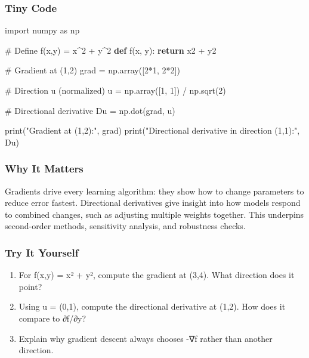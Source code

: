 \documentclass[
  letterpaper,
  DIV=11,
  numbers=noendperiod]{scrreprt}
\newenvironment{Shaded}{\begin{snugshade}}{\end{snugshade}}
\newcommand{\BuiltInTok}[1]{\textcolor[rgb]{0.00,0.23,0.31}{#1}}
\newcommand{\CommentTok}[1]{\textcolor[rgb]{0.37,0.37,0.37}{#1}}
\newcommand{\ControlFlowTok}[1]{\textcolor[rgb]{0.00,0.23,0.31}{\textbf{#1}}}
\newcommand{\DecValTok}[1]{\textcolor[rgb]{0.68,0.00,0.00}{#1}}
\newcommand{\ImportTok}[1]{\textcolor[rgb]{0.00,0.46,0.62}{#1}}
\newcommand{\KeywordTok}[1]{\textcolor[rgb]{0.00,0.23,0.31}{\textbf{#1}}}
\newcommand{\NormalTok}[1]{\textcolor[rgb]{0.00,0.23,0.31}{#1}}
\newcommand{\OperatorTok}[1]{\textcolor[rgb]{0.37,0.37,0.37}{#1}}
\newcommand{\StringTok}[1]{\textcolor[rgb]{0.13,0.47,0.30}{#1}}
\providecommand{\tightlist}{%
  \setlength{\itemsep}{0pt}\setlength{\parskip}{0pt}}
\begin{document}
\subsubsection{Tiny Code}\label{tiny-code-113}

\begin{Shaded}
\begin{Highlighting}[]
\ImportTok{import}\NormalTok{ numpy }\ImportTok{as}\NormalTok{ np}

\CommentTok{\# Define f(x,y) = x\^{}2 + y\^{}2}
\KeywordTok{def}\NormalTok{ f(x, y):}
    \ControlFlowTok{return}\NormalTok{ x2 }\OperatorTok{+}\NormalTok{ y2}

\CommentTok{\# Gradient at (1,2)}
\NormalTok{grad }\OperatorTok{=}\NormalTok{ np.array([}\DecValTok{2}\OperatorTok{*}\DecValTok{1}\NormalTok{, }\DecValTok{2}\OperatorTok{*}\DecValTok{2}\NormalTok{])}

\CommentTok{\# Direction u (normalized)}
\NormalTok{u }\OperatorTok{=}\NormalTok{ np.array([}\DecValTok{1}\NormalTok{, }\DecValTok{1}\NormalTok{]) }\OperatorTok{/}\NormalTok{ np.sqrt(}\DecValTok{2}\NormalTok{)}

\CommentTok{\# Directional derivative}
\NormalTok{Du }\OperatorTok{=}\NormalTok{ np.dot(grad, u)}

\BuiltInTok{print}\NormalTok{(}\StringTok{"Gradient at (1,2):"}\NormalTok{, grad)}
\BuiltInTok{print}\NormalTok{(}\StringTok{"Directional derivative in direction (1,1):"}\NormalTok{, Du)}
\end{Highlighting}
\end{Shaded}

\subsubsection{Why It Matters}\label{why-it-matters-11}

Gradients drive every learning algorithm: they show how to change
parameters to reduce error fastest. Directional derivatives give insight
into how models respond to combined changes, such as adjusting multiple
weights together. This underpins second-order methods, sensitivity
analysis, and robustness checks.

\subsubsection{Try It Yourself}\label{try-it-yourself-113}

\begin{enumerate}
\def\labelenumi{\arabic{enumi}.}
\tightlist
\item
  For f(x,y) = x² + y², compute the gradient at (3,4). What direction
  does it point?
\item
  Using u = (0,1), compute the directional derivative at (1,2). How does
  it compare to ∂f/∂y?
\item
  Explain why gradient descent always chooses -∇f rather than another
  direction.
\end{enumerate}
\end{document}
